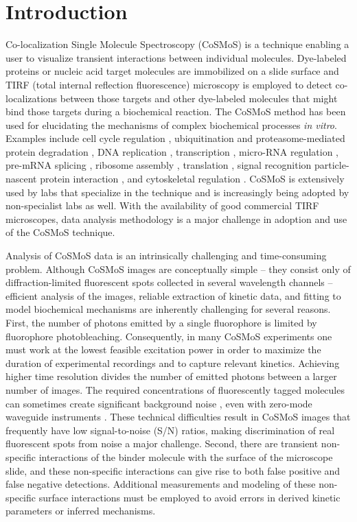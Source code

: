 \section{Introduction}

Co-localization Single Molecule Spectroscopy (CoSMoS) is a technique enabling a user to visualize transient interactions between individual molecules.  Dye-labeled proteins or nucleic acid target molecules are immobilized on a slide surface and TIRF (total internal reflection fluorescence) microscopy is employed to detect co-localizations between those targets and other dye-labeled molecules that might bind those targets during a biochemical reaction.  The CoSMoS method has been used for elucidating the mechanisms of complex biochemical processes \textit{in vitro}.    Examples include cell cycle regulation \citep{Lu2015-eu}, ubiquitination and proteasome-mediated protein degradation \citep{Lu2015-jq}, DNA replication \citep{Geertsema2014-bt,Ticau2015-ib}, transcription \citep{Zhang2012-no,Friedman2012-if,Friedman2013-sf}, micro-RNA regulation \citep{Salomon2015-kq}, pre-mRNA splicing \citep{Shcherbakova2013-bi, Krishnan2013-fy, Warnasooriya2014-ls}, ribosome assembly \citep{Kim2014-zc}, translation \citep{Wang2015-tt,Tsai2014-mi,OLeary2013-wo}, signal recognition particle-nascent protein interaction \citep{Noriega2014-vj}, and cytoskeletal regulation \citep{Smith2013-qj,Breitsprecher2012-mj}. CoSMoS is extensively used by labs that specialize in the technique and is increasingly being adopted by non-specialist labs as well. With the availability of good commercial TIRF microscopes, data analysis methodology is a major challenge in adoption and use of the CoSMoS technique.

Analysis of CoSMoS data is an intrinsically challenging and time-consuming problem. Although CoSMoS images are conceptually simple -- they consist only of diffraction-limited fluorescent spots collected in several wavelength channels -- efficient analysis of the images, reliable extraction of kinetic data, and fitting to model biochemical mechanisms are inherently challenging for several reasons. First, the number of photons emitted by a single fluorophore is limited by fluorophore photobleaching. Consequently, in many CoSMoS experiments one must work at the lowest feasible excitation power in order to maximize the duration of experimental recordings and to capture relevant kinetics. Achieving higher time resolution divides the number of emitted photons between a larger number of images. The required  concentrations of fluorescently tagged molecules can sometimes create significant background noise \citep{Peng2018-ge, Van_Oijen2011-ig}, even with zero-mode waveguide instruments \citep{Chen2014-jd}. These technical difficulties result in CoSMoS images that frequently have low signal-to-noise (S/N) ratios, making discrimination of real fluorescent spots from noise a major challenge. Second, there are transient non-specific interactions of the binder molecule with the surface of the microscope slide, and these non-specific interactions can give rise to both false positive and false negative detections. Additional measurements and modeling of these non-specific surface interactions must be employed to avoid errors in derived kinetic parameters or inferred mechanisms.

